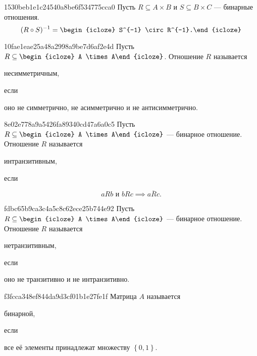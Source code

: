 \begin{note}{1530beb1e1c24540a8be6f534775cca0}
    Пусть \({ R \subseteq A \times B }\) и \({ S \subseteq B \times C }\) --- бинарные отношения.
    \[
        (R \circ S)^{-1} = \begin{icloze}{1}S^{-1} \circ R^{-1}.\end{icloze}
    \]
\end{note}

\begin{note}{10fae1eae25a48a2998a9be7d6af2e4d}
    Пусть \({ R \subseteq \begin{icloze}{3}A \times A\end{icloze} }\).
    Отношение \({ R }\) называется \begin{icloze}{2}несимметричным,\end{icloze} если \begin{icloze}{1}оно не симметрично, не асимметрично и не антисимметрично.\end{icloze}
\end{note}

\begin{note}{8e02e778a9a5426fa89340cd47a6a0c5}
    Пусть \({ R \subseteq \begin{icloze}{3}A \times A\end{icloze} }\) --- бинарное отношение.
    Отношение \({ R }\) называется \begin{icloze}{2}интранзитивным,\end{icloze} если
    \begin{icloze}{1}
        \[
            aRb \text{ и } bRc \implies \overline{aRc}.
        \]
    \end{icloze}
\end{note}

\begin{note}{fdbc65b9ca3c4a5c8c62ece25b744e92}
    Пусть \({ R \subseteq \begin{icloze}{3}A \times A\end{icloze} }\) --- бинарное отношение.
    Отношение \({ R }\) называется \begin{icloze}{2}нетранзитивным,\end{icloze} если \begin{icloze}{1}оно не транзитивно и не интранзитивно.\end{icloze}
\end{note}

\begin{note}{f3fcca348ef844da9d3cf01b1e27fe1f}
    Матрица \({ A }\) называется \begin{icloze}{2}бинарной,\end{icloze} если \begin{icloze}{1}все её элементы принадлежат множеству \({ \left\{ 0, 1 \right\} }\).\end{icloze}
\end{note}

